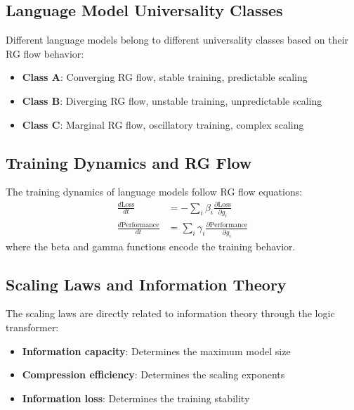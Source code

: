 \subsection{Language Model Universality Classes}

\begin{definition}
\label{def:lm-universality}
Different language models belong to different universality classes based on their RG flow behavior:
\begin{itemize}
\item \textbf{Class A}: Converging RG flow, stable training, predictable scaling
\item \textbf{Class B}: Diverging RG flow, unstable training, unpredictable scaling
\item \textbf{Class C}: Marginal RG flow, oscillatory training, complex scaling
\end{itemize}
\end{definition}

\subsection{Training Dynamics and RG Flow}

\begin{theorem}
\label{thm:training-dynamics}
The training dynamics of language models follow RG flow equations:
\begin{align}
\frac{d\text{Loss}}{dt} &= -\sum_i \beta_i \frac{\partial \text{Loss}}{\partial g_i} \\
\frac{d\text{Performance}}{dt} &= \sum_i \gamma_i \frac{\partial \text{Performance}}{\partial g_i}
\end{align}
where the beta and gamma functions encode the training behavior.
\end{theorem}

\subsection{Scaling Laws and Information Theory}

\begin{theorem}
\label{thm:scaling-information}
The scaling laws are directly related to information theory through the logic transformer:
\begin{itemize}
\item \textbf{Information capacity}: Determines the maximum model size
\item \textbf{Compression efficiency}: Determines the scaling exponents
\item \textbf{Information loss}: Determines the training stability
\end{itemize}
\end{theorem}

